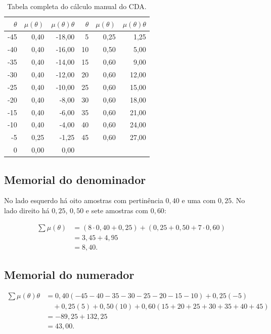 \documentclass[12pt,a4paper]{article}
\begin{document}
\begin{table}[H]
\centering
\caption{Tabela completa do cálculo manual do CDA.}
\setlength{\tabcolsep}{10pt}
\begin{tabular}{rrr@{\qquad}rrr}
\toprule
$\theta$ & $\mu(\theta)$ & $\mu(\theta)\theta$ &
$\theta$ & $\mu(\theta)$ & $\mu(\theta)\theta$ \\
\midrule
-45 & 0,40 & -18,00 & 5  & 0,25 & 1,25 \\
-40 & 0,40 & -16,00 & 10 & 0,50 & 5,00 \\
-35 & 0,40 & -14,00 & 15 & 0,60 & 9,00 \\
-30 & 0,40 & -12,00 & 20 & 0,60 & 12,00 \\
-25 & 0,40 & -10,00 & 25 & 0,60 & 15,00 \\
-20 & 0,40 & -8,00  & 30 & 0,60 & 18,00 \\
-15 & 0,40 & -6,00  & 35 & 0,60 & 21,00 \\
-10 & 0,40 & -4,00  & 40 & 0,60 & 24,00 \\
-5  & 0,25 & -1,25  & 45 & 0,60 & 27,00 \\
0   & 0,00 & 0,00   &    &      &       \\
\bottomrule
\end{tabular}
\end{table}

\subsection*{Memorial do denominador}

No lado esquerdo há oito amostras com pertinência $0{,}40$ e uma com
$0{,}25$. No lado direito há $0{,}25$, $0{,}50$ e sete amostras com
$0{,}60$:

\begin{align*}
\sum\mu(\theta)
&=(8\cdot0{,}40+0{,}25)+(0{,}25+0{,}50+7\cdot0{,}60)\\
&=3{,}45+4{,}95\\
&=\boxed{8{,}40}.
\end{align*}

\subsection*{Memorial do numerador}

\begin{align*}
\sum\mu(\theta)\theta
&=0{,}40(-45-40-35-30-25-20-15-10)+0{,}25(-5)\\
&\quad+0{,}25(5)+0{,}50(10)
+0{,}60(15+20+25+30+35+40+45)\\
&=-89{,}25+132{,}25\\
&=\boxed{43{,}00}.
\end{align*}
\end{document}
